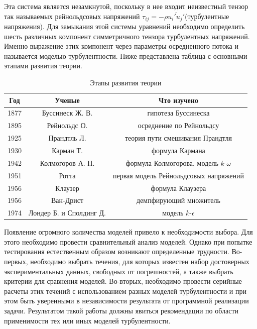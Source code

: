 	Эта система является незамкнутой, поскольку в нее входит неизвестный тензор так называемых рейнольдсовых напряжений $\tau_{ij} = -\rho\overline{u_i' u_j'}$(турбулентные напряжения). Для замыкания этой системы уравнений необходимо определить шесть различных компонент симметричного тензора турбулентных напряжений. Именно выражение этих компонент через параметры осредненного потока и называется моделью турбулентности. Ниже представлена таблица с основными этапами развития теории.
	
	\begin{table}[H]
		\begin{center}
			\begin{tabular}{|c|c|c|}
				\hline
				Год & Ученые & Что изучено\\
				\hline
				1877 & Буссинеск Ж. В. & гипотеза Буссинеска\\
				\hline
				1895 & Рейнольдс О. & осреднение по Рейнольдсу\\
				\hline
				1925 & Прандтль Л. & теория пути смешивания Прандтля\\
				\hline
				1930 & Карман Т. & формула Кармана\\
				\hline
				1942 & Колмогоров А. Н. & формула Колмогорова, модель $k$-$\omega$\\
				\hline
				1951 & Ротта & первая модель Рейнольдсовых напряжений\\
				\hline
				1956 & Клаузер & формула Клаузера\\
				\hline
				1956 & Ван-Дрист & демпфирующий множитель\\
				\hline
				1974 & Лондер Б. и Сполдинг Д. & модель $k$-$\epsilon$\\
				\hline
			\end{tabular}
		\end{center}
		\caption{Этапы развития теории}
	\end{table}
	
	Появление огромного количества моделей привело к необходимости выбора. Для этого необходимо провести сравнительный анализ моделей. Однако при попытке тестирования естественным образом возникают определенные трудности. Во-первых, необходимо выбрать течения, для которых известен набор достоверных экспериментальных данных, свободных от погрешностей, а также выбрать критерии для сравнения моделей. Во-вторых, необходимо провести серийные расчеты этих течений с использованием разных моделей турбулентности и при этом быть уверенными в независимости результата от программной реализации задачи. Результатом такой работы должны явиться рекомендации по области применимости тех или иных моделей турбулентности.

